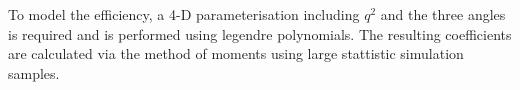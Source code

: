 \documentclass[%
 reprint,
 amsmath,amssymb,
 aps,
]{revtex4-2}
\begin{document}
To model the efficiency, a 4-D parameterisation including $q^2$ and the three angles is required and is performed using
legendre polynomials. The resulting coefficients are calculated via the method of moments using large stattistic simulation samples.

\end{document}

